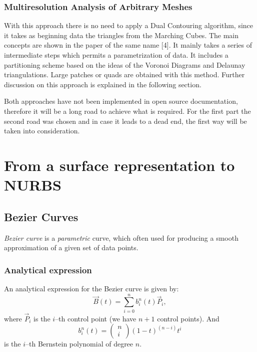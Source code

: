 \subsubsection{Multiresolution Analysis of Arbitrary Meshes}
With this approach there is no need to apply a Dual Contouring algorithm, since it takes as
beginning data the triangles from the Marching Cubes. The main concepts are shown in the paper
of the same name [4]. It mainly takes a series of intermediate steps which permits a parametrization of data. It includes a partitioning scheme based on the ideas of the Voronoi Diagrams and Delaunay triangulations. Large patches or quads are obtained with this method. Further discussion on this approach is explained in the following section.


Both approaches have not been implemented in open source documentation, therefore it will be
a long road to achieve what is required. For the first part the second
road was chosen and in case it leads to a dead end, the first way will be taken into consideration.


\section{From a surface representation to NURBS}
\subsection{Bezier Curves}
\emph{Bezier curve} is a \textit{parametric} curve, which often used for producing a smooth approximation of a given set of data points.
\subsubsection{Analytical expression} 
An analytical expression for the Bezier curve is given by:
\begin{equation*}
\vec{B}(t)=\sum\limits_{i=0}^n b_i^n(t) \vec{P}_i,
\end{equation*}
where $\vec{P}_i$ is the $i$--th control point (we have $n+1$ control points). And
\begin{equation*}
b_i^n(t)=\left(\begin{array}{c}n\\i\end{array}\right)(1-t)^{(n-i)}t^i
\end{equation*}
is the $i$--th Bernstein polynomial of degree $n$.

